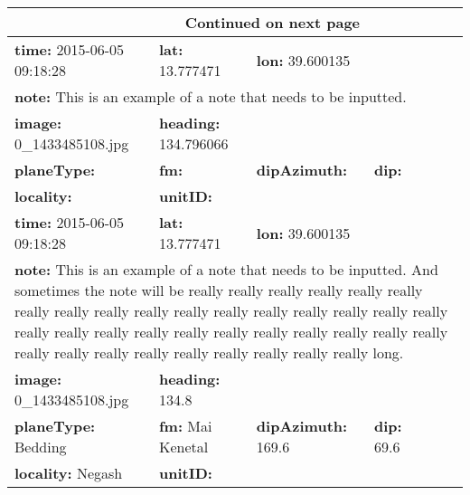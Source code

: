 \documentclass[11pt]{article}
\begin{document}
\begin{longtable}{lllllll} %
\toprule
\midrule
\endhead
\midrule
\multicolumn{3}{r}{{Continued on next page}} \\
\midrule
\endfoot

\bottomrule
\endlastfoot
\textbf{time:} 2015-06-05 09:18:28 &  \textbf{lat:} 13.777471 &  \textbf{lon:} 39.600135 & & & & \\
\hline
\multicolumn{7}{p{\linewidth}}{\textbf{note:} This is an example of a note that needs to be inputted.} \\
\textbf{image:} 0\_1433485108.jpg &  \textbf{heading:} 134.796066 & & & & & \\
\textbf{planeType:} & \textbf{fm:} & \textbf{dipAzimuth:} & \textbf{dip:} & & & \\
\textbf{locality:} & \textbf{unitID:} & & & & & \\
\hline
\hline

\textbf{time:} 2015-06-05 09:18:28 &  \textbf{lat:} 13.777471 &  \textbf{lon:} 39.600135 & & & & \\
\hline
\multicolumn{7}{p{\linewidth}}{\textbf{note:} This is an example of a note that needs to be inputted. And sometimes the note will be really really really really really really really really really really really really really really really really really really really really really really really really really really really really really really really really really really really really really long.} \\
\textbf{image:} 0\_1433485108.jpg &  \textbf{heading:} 134.8 & & & & & \\
\textbf{planeType:} Bedding & \textbf{fm:} Mai Kenetal & \textbf{dipAzimuth:} 169.6 & \textbf{dip:} 69.6 & & & \\
\textbf{locality:} Negash & \textbf{unitID:} & & & & & \\
\end{longtable}
\end{document}
